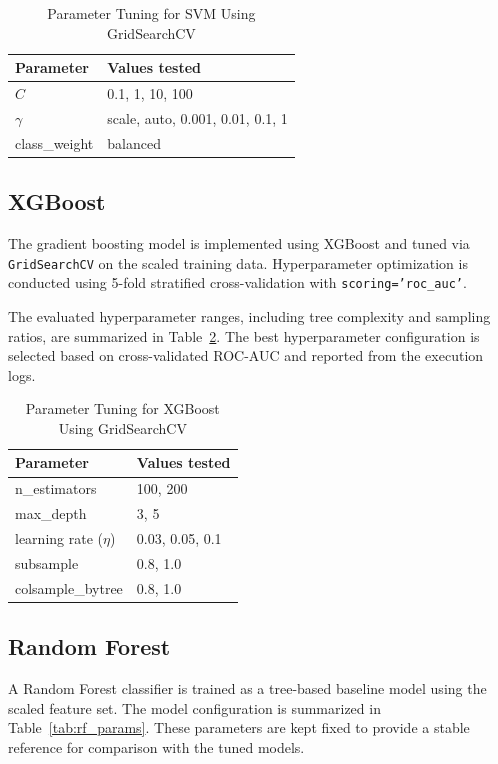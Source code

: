 \documentclass[10pt,conference]{IEEEtran}
\begin{document}
\begin{table}[t]
\centering
\caption{Parameter Tuning for SVM Using GridSearchCV}
\label{tab:svm_grid}
\begin{tabular}{@{}ll@{}}
\toprule
Parameter & Values tested \\
\midrule
$C$ & 0.1, 1, 10, 100 \\
$\gamma$ & scale, auto, 0.001, 0.01, 0.1, 1 \\
class\_weight & balanced \\
\bottomrule
\end{tabular}
\end{table}


\subsection{XGBoost}
The gradient boosting model is implemented using XGBoost and tuned via
\texttt{GridSearchCV} on the scaled training data. Hyperparameter optimization
is conducted using 5-fold stratified cross-validation with
\texttt{scoring='roc\_auc'}.

The evaluated hyperparameter ranges, including tree complexity and sampling
ratios, are summarized in Table~\ref{tab:xgb_grid}. The best hyperparameter
configuration is selected based on cross-validated ROC-AUC and reported from
the execution logs.

\begin{table}[t]
\centering
\caption{Parameter Tuning for XGBoost Using GridSearchCV}
\label{tab:xgb_grid}
\begin{tabular}{@{}ll@{}}
\toprule
Parameter & Values tested \\
\midrule
n\_estimators & 100, 200 \\
max\_depth & 3, 5 \\
learning rate ($\eta$) & 0.03, 0.05, 0.1 \\
subsample & 0.8, 1.0 \\
colsample\_bytree & 0.8, 1.0 \\
\bottomrule
\end{tabular}
\end{table}


\subsection{Random Forest}
A Random Forest classifier is trained as a tree-based baseline model using the
scaled feature set. The model configuration is summarized in
Table~\ref{tab:rf_params}. These parameters are kept fixed to provide a stable
reference for comparison with the tuned models.
\end{document}
